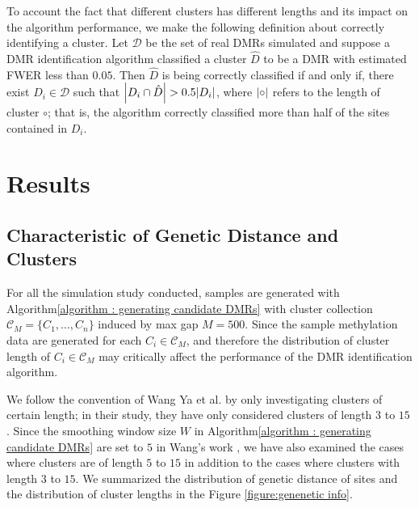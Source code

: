 \documentclass{report}
\begin{document}
\par
To account the fact that different clusters has different lengths and its impact on the algorithm performance, we
make the following definition about correctly identifying a cluster. Let $\mathcal{D}$ be the set of real DMRs simulated and suppose a DMR identification algorithm classified a cluster
$\hat{D}$ to be a DMR with estimated FWER less than $0.05$. Then $\hat{D}$ is being correctly classified if and only if, there exist
$D_i \in \mathcal{D}$ such that $\abs{D_i \cap \hat{D}} > 0.5 \abs{D_i}$, where $\abs{\circ}$ refers to the length of cluster $\circ$;
that is, the algorithm correctly classified more than half of the sites contained in $D_i$.



\chapter{Results} \label{chapter 4}

\section{Characteristic of Genetic Distance and Clusters}
\par
For all the simulation study conducted, samples are generated with
Algorithm\ref{algorithm : generating candidate DMRs} with cluster collection $\mathcal{C}_M = \{C_1,\ldots,C_n\}$ induced by max gap $M = 500$.
Since the sample methylation data are generated for each $C_i \in \mathcal{C}_M$,  and therefore the distribution of cluster length of $C_i \in \mathcal{C}_M$ 
may critically affect the performance of the DMR identification algorithm. 
\par We follow the convention of Wang Ya et al. by only investigating clusters of certain length; in their study, they have only considered clusters
of length $3$ to $15$ \cite{wang2017accounting}. Since the smoothing window size $W$ in Algorithm\ref{algorithm : generating candidate DMRs} are set to $5$ in Wang's work \cite{wang2017accounting},
we have also examined the cases where clusters are of length $5$ to $15$ in addition to the cases where clusters with length $3$ to $15$. We summarized
the distribution of genetic distance of sites and the distribution of cluster lengths in the Figure \ref{figure:genenetic info}.
\end{document}
